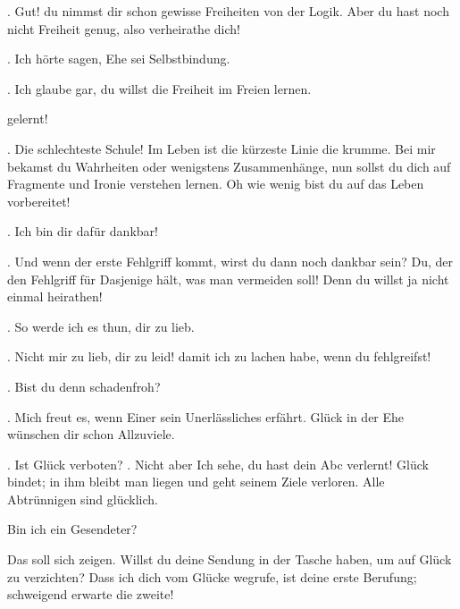 . Gut! du nimmst dir schon gewisse Freiheiten von der Logik. Aber du hast noch nicht Freiheit genug, also verheirathe dich!
\par

. Ich hörte sagen, Ehe sei Selbstbindung.
\par

. Ich glaube gar, du willst die Freiheit im Freien lernen.
\par

 gelernt!
\par

. Die schlechteste Schule! Im Leben ist die kürzeste Linie die krumme. Bei mir bekamst du Wahrheiten oder wenigstens Zusammenhänge, nun sollst du dich auf Fragmente und Ironie verstehen lernen. Oh wie wenig bist du auf das Leben vorbereitet!
\par

. Ich bin dir dafür dankbar!
\par

. Und wenn der erste Fehlgriff kommt, wirst du dann noch dankbar sein? Du, der den Fehlgriff für Dasjenige hält, was man vermeiden soll! Denn du willst ja nicht einmal heirathen!
\par

. So werde ich es thun, dir zu lieb.
\par

. Nicht mir zu lieb, dir zu leid! damit ich zu lachen habe, wenn du fehlgreifst!
\par

. Bist du denn schadenfroh?
\par

. Mich freut es, wenn Einer sein Unerlässliches erfährt. Glück in der Ehe wünschen dir schon Allzuviele.
\par

. Ist Glück verboten? . Nicht  aber  Ich sehe, du hast dein Abc verlernt! Glück bindet; in ihm bleibt man liegen und geht seinem Ziele verloren. Alle Abtrünnigen sind glücklich.
\par

 Bin ich ein Gesendeter?
\par

 Das soll sich zeigen. Willst du deine Sendung in der Tasche haben, um auf Glück zu verzichten? Dass ich dich vom Glücke wegrufe, ist deine erste Berufung; schweigend erwarte die zweite!
\par

